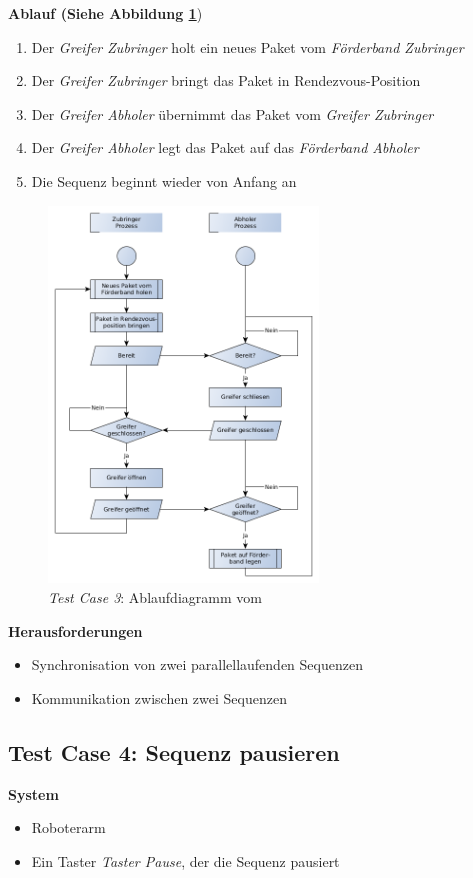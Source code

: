 \textbf{Ablauf (Siehe Abbildung \ref{Testcase03Picture}})
\begin{enumerate}
\item Der \textit{Greifer Zubringer} holt ein neues Paket vom \textit{Förderband Zubringer}
\item Der \textit{Greifer Zubringer} bringt das Paket in Rendezvous-Position
\item Der \textit{Greifer Abholer} übernimmt das Paket vom \textit{Greifer Zubringer} 
\item Der \textit{Greifer Abholer} legt das Paket auf das \textit{Förderband Abholer}
\item Die Sequenz beginnt wieder von Anfang an
\end{enumerate}

\begin{figure}[]
\centering
\includegraphics[angle=0,height=10cm]{images/Testcase03.png}
\caption{\textit{Test Case 3}: Ablaufdiagramm vom}
\label{Testcase03Picture}
\end{figure}

\textbf{Herausforderungen}
\begin{itemize}
\item Synchronisation von zwei parallellaufenden Sequenzen
\item Kommunikation zwischen zwei Sequenzen
\end{itemize}


\subsection{Test Case 4: Sequenz pausieren}
\textbf{System}
\begin{itemize}
\item Roboterarm
\item Ein Taster \textit{Taster Pause}, der die Sequenz pausiert
\end{itemize}

